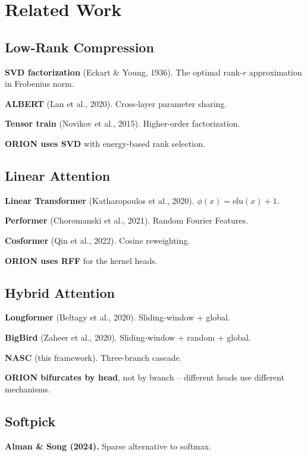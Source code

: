 
\section{Related Work}

\subsection{Low-Rank Compression}

\textbf{SVD factorization} (Eckart \& Young, 1936). The optimal rank-$r$ 
approximation in Frobenius norm.

\textbf{ALBERT} (Lan et al., 2020). Cross-layer parameter sharing.

\textbf{Tensor train} (Novikov et al., 2015). Higher-order factorization.

\textbf{ORION uses SVD} with energy-based rank selection.

\subsection{Linear Attention}

\textbf{Linear Transformer} (Katharopoulos et al., 2020). $\phi(x) = \text{elu}(x) + 1$.

\textbf{Performer} (Choromanski et al., 2021). Random Fourier Features.

\textbf{Cosformer} (Qin et al., 2022). Cosine reweighting.

\textbf{ORION uses RFF} for the kernel heads.

\subsection{Hybrid Attention}

\textbf{Longformer} (Beltagy et al., 2020). Sliding-window + global.

\textbf{BigBird} (Zaheer et al., 2020). Sliding-window + random + global.

\textbf{NASC} (this framework). Three-branch cascade.

\textbf{ORION bifurcates by head}, not by branch -- different heads use different 
mechanisms.

\subsection{Softpick}

\textbf{Alman \& Song (2024).} Sparse alternative to softmax.

